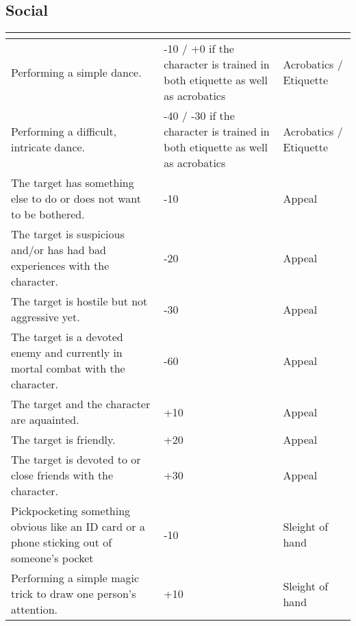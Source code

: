 \documentclass[12pt,a4paper,openany]{book}
\newcommand{\ul}[1]{\underline{\smash{#1}}}
\begin{document}
	\subsection{Social}
	\begin{tabularx}{\textwidth}{|X|X|l|}
		\hline
		\ul{Situation} & \ul{Modifier} & \ul{Focussed skill} \\ \hline
		Performing a simple dance. & -10 / +0 if the character is trained in both etiquette as well as acrobatics & Acrobatics / Etiquette \\ \hline
		Performing a difficult, intricate dance. & -40 / -30 if the character is trained in both etiquette as well as acrobatics & Acrobatics / Etiquette \\ \hline
		The target has something else to do or does not want to be bothered. & -10 & Appeal \\ \hline
		The target is suspicious and/or has had bad experiences with the character. & -20 & Appeal \\ \hline
		The target is hostile but not aggressive yet. & -30 & Appeal \\ \hline
		The target is a devoted enemy and currently in mortal combat with the character. & -60 & Appeal \\ \hline
		The target and the character are aquainted. & +10 & Appeal \\ \hline
		The target is friendly. & +20 & Appeal \\ \hline
		The target is devoted to or close friends with the character. & +30 & Appeal \\ \hline
		Pickpocketing something obvious like an ID card or a phone sticking out of someone's pocket & -10 & Sleight of hand \\ \hline
		Performing a simple magic trick to draw one person's attention. & +10 & Sleight of hand \\ \hline
	\end{tabularx}
\end{document}
